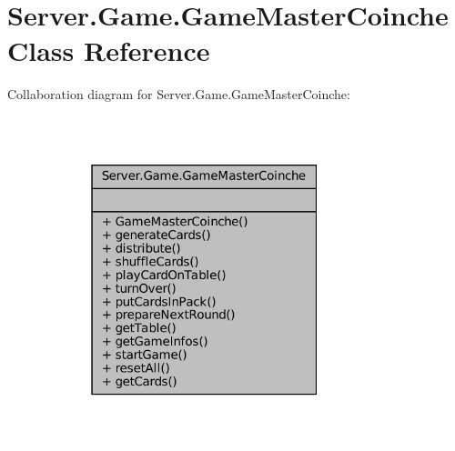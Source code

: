 \hypertarget{classServer_1_1Game_1_1GameMasterCoinche}{}\section{Server.\+Game.\+Game\+Master\+Coinche Class Reference}
\label{classServer_1_1Game_1_1GameMasterCoinche}


Collaboration diagram for Server.\+Game.\+Game\+Master\+Coinche\+:
\nopagebreak
\begin{figure}[H]
\begin{center}
\leavevmode
\includegraphics[width=265pt]{classServer_1_1Game_1_1GameMasterCoinche__coll__graph}
\end{center}
\end{figure}
